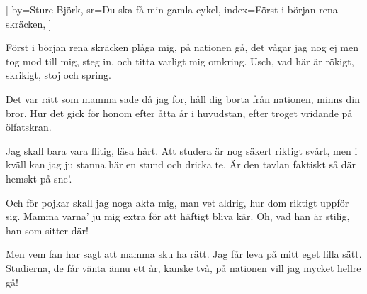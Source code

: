 
[
	by={Sture Björk},
	sr={Du ska få min gamla cykel},
	index={Först i början rena skräcken},
	]

\beginverse*
Först i början rena skräcken plåga mig,
på nationen gå, det vågar jag nog ej
men tog mod till mig, steg in,
och titta varligt mig omkring.
Usch, vad här är rökigt, skrikigt, stoj och spring.
\endverse

\beginverse*
Det var rätt som mamma sade då jag for,
håll dig borta från nationen, minns din bror.
Hur det gick för honom
efter åtta år i huvudstan,
efter troget vridande på ölfatskran.
\endverse

\beginverse*
Jag skall bara vara flitig, läsa hårt.
Att studera är nog säkert riktigt svårt,
men i kväll kan jag ju stanna här en stund
och dricka te.
Är den tavlan faktiskt så där hemskt på sne'.
\endverse

\beginverse*
Och för pojkar skall jag noga akta mig,
man vet aldrig, hur dom riktigt uppför sig.
Mamma varna' ju mig extra
för att häftigt bliva kär.
Oh, vad han är stilig, han som sitter där!
\endverse

\beginverse*
Men vem fan har sagt att mamma sku ha rätt.
Jag får leva på mitt eget lilla sätt.
Studierna, de får vänta ännu ett år, kanske två,
på nationen vill jag mycket hellre gå!
\endverse


\endsong